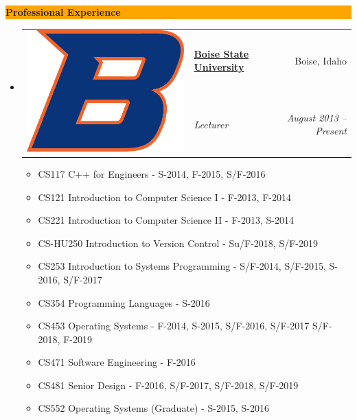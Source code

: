 \documentclass[letterpaper,11pt]{article}
\makeatletter
\newcommand{\resitem}[1]{\item #1 \vspace{-2pt}}
\newcommand{\resheading}[1]{{\large
    \colorbox{Orange}{\begin{minipage}{\textwidth}{\textbf{#1
            \vphantom{p\^{E}}}}\end{minipage}}}}
\newcommand{\ressubheadingG}[5]{
\item[]
	\begin{tabular*}{6.5in}{l@{\hspace{.1in}} l@{\extracolsep{\fill}}r}
		\multirow{2}{1in}{#1} & \textbf{#2} & #3 \\
		& \textit{#4} & \textit{#5} \\
         \end{tabular*}
	 \vspace{-6pt}}
\makeatother
\begin{document}
\resheading{Professional Experience}
\begin{itemize}
    \ressubheadingG
    {\includegraphics[scale=.3]{bsu.jpg}}
    {{\href{https://boisestate.edu}{Boise State University}}}
    {Boise, Idaho}
    {Lecturer}
    {August 2013 -- Present}
    { \footnotesize
    \begin{itemize}
	    \resitem{CS117 C++ for Engineers -
		     S-2014, F-2015, S/F-2016
		    }
	    \resitem{CS121 Introduction to Computer Science I -
		     F-2013, F-2014
		    }
            \resitem{CS221 Introduction to Computer Science II -
	             F-2013, S-2014
		    }
            \resitem{CS-HU250 Introduction to Version Control -
		     Su/F-2018, S/F-2019
		    }
            \resitem{CS253 Introduction to Systems Programming -
		     S/F-2014, S/F-2015, S-2016, S/F-2017
		    }
            \resitem{CS354 Programming Languages -
		    S-2016
		    }
            \resitem{CS453 Operating Systems -
		     F-2014, S-2015, S/F-2016, S/F-2017 S/F-2018, F-2019
		    }
	    \resitem{CS471 Software Engineering -
		    F-2016
		    }
	    \resitem{CS481 Senior Design -
                    F-2016, S/F-2017, S/F-2018, S/F-2019
		    }
            \resitem{CS552 Operating Systems (Graduate) -
		     S-2015, S-2016
		    }
    \end{itemize}
  }


\end{itemize}
\end{document}
